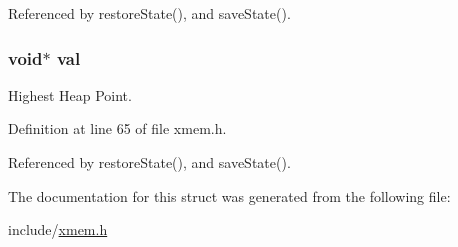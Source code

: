 Referenced by restore\-State(), and save\-State().

\hypertarget{struct_malloc_state_ab03f36f103bdec81305fd301f1f93885}{
\subsubsection[{val}]{\setlength{\rightskip}{0pt plus 5cm}void$\ast$ val}}\label{struct_malloc_state_ab03f36f103bdec81305fd301f1f93885}


Highest Heap Point. 



Definition at line 65 of file xmem.\-h.



Referenced by restore\-State(), and save\-State().



The documentation for this struct was generated from the following file\-:\begin{DoxyCompactItemize}
\item 
include/\hyperlink{xmem_8h}{xmem.\-h}\end{DoxyCompactItemize}
